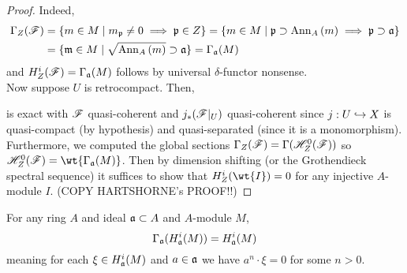 \documentclass[12pt]{article}
\begin{document}
\begin{proof}
Indeed,
\begin{align*}
\Gamma_Z(\mathscr{F}) & = \{ m \in M \mid m_{\mathfrak{p}} \neq 0 \implies \mathfrak{p} \in Z \} = \{ m \in M \mid \mathfrak{p} \supset \mathrm{Ann}_{A}\left(m\right) \implies \mathfrak{p} \supset \mathfrak{a} \} 
\\
& = \{ \mathfrak{m} \in M \mid \sqrt{\mathrm{Ann}_{A}\left(m\right)} \supset \mathfrak{a} \} = \Gamma_{\mathfrak{a}}(M)
\end{align*}
and $H^i_Z(\mathscr{F}) = \Gamma_{\mathfrak{a}}(M)$ follows by universal $\delta$-functor nonsense.
\bigskip\\
Now suppose $U$ is retrocompact. Then,
\begin{center}
\end{center}
is exact with $\mathscr{F}$ quasi-coherent and $j_* (\mathscr{F}|_U)$ quasi-coherent since $j : U \hookrightarrow X$ is quasi-compact (by hypothesis) and quasi-separated (since it is a monomorphism). Furthermore, we computed the global sections $\Gamma_Z(\mathscr{F}) = \Gamma(\mathscr{H}^0_Z(\mathscr{F}))$ so $\H^0_Z(\F) = \wt{\Gamma_{\a}(M)}$. Then by dimension shifting (or the Grothendieck spectral sequence) it suffices to show that $H^i_Z(\wt{I}) = 0$ for any injective $A$-module $I$. {\color{red} (COPY HARTSHORNE's PROOF!!)}

\end{proof}


\begin{lemma}
For any ring $A$ and ideal $\mathfrak{a} \subset A$ and $A$-module $M$,
\[ \Gamma_{\mathfrak{a}}(H^i_{\mathfrak{a}}(M)) = H^i_{\mathfrak{a}}(M) \]
meaning for each $\xi \in H^i_{\mathfrak{a}}(M)$ and $a \in \mathfrak{a}$ we have $a^n \cdot \xi = 0$ for some $n > 0$.
\end{lemma}
\end{document}
